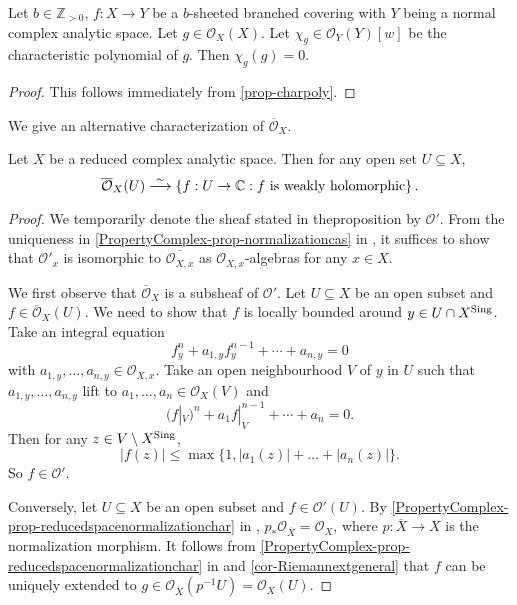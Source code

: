 \begin{proposition}\label{prop-charpolygen}
    Let $b\in \mathbb{Z}_{>0}$, $f:X\rightarrow Y$ be a $b$-sheeted branched covering with $Y$ being a normal complex analytic space. Let $g\in \mathcal{O}_X(X)$. Let $\chi_g\in \mathcal{O}_Y(Y)[w]$ be the characteristic polynomial of $g$. Then $\chi_g(g)=0$.
\end{proposition}
\begin{proof}
    This follows immediately from \cref{prop-charpoly}.
\end{proof}

We give an alternative characterization of $\overline{\mathcal{O}}_X$.
\begin{proposition}
    Let $X$ be a reduced complex analytic space. Then for any open set $U\subseteq X$, 
    \[
        \overline{\mathcal{O}}_X(U)\stackrel{\sim}{\longrightarrow} \left\{f:U\rightarrow \mathbb{C}: f\text{ is weakly holomorphic} \right\}.      
    \]
\end{proposition}

\begin{proof}
    We temporarily denote the sheaf stated in theproposition by $\mathcal{O}'$. From the uniqueness in \cref{PropertyComplex-prop-normalizationcas} in , it suffices to show that $\mathcal{O}'_{x}$ is isomorphic to $\overline{\mathcal{O}_{X,x}}$ as $\mathcal{O}_{X,x}$-algebras for any $x\in X$.

    We first observe that $\overline{\mathcal{O}}_X$ is a subsheaf of  $\mathcal{O}'$. Let $U\subseteq X$ be an open subset and $f\in \overline{\mathcal{O}}_X(U)$.  We need to show that $f$ is locally bounded around $y\in U\cap X^{\operatorname{Sing}}$. 
    Take an integral equation
    \[
        f_y^n+a_{1,y}f_y^{n-1}+\cdots+a_{n,y}=0  
    \]
    with $a_{1,y},\ldots,a_{n,y}\in \mathcal{O}_{X,x}$.
    Take an open neighbourhood $V$ of $y$ in $U$ such that $a_{1,y},\ldots,a_{n,y}$ lift to $a_1,\ldots,a_n\in \mathcal{O}_X(V)$ and
    \[
        (f|_V)^n +a_1f|_V^{n-1}+\cdots+ a_n=0. 
    \] 
    Then for any $z\in V\setminus X^{\operatorname{Sing}}$,
    \[
        |f(z)|\leq \max\{1,|a_1(z)|+\ldots+|a_n(z)|\}.  
    \]
    So $f\in \mathcal{O}'$. 
    
    Conversely, let $U\subseteq X$ be an open subset and $f\in \mathcal{O}'(U)$. By \cref{PropertyComplex-prop-reducedspacenormalizationchar} in , $p_*\mathcal{O}_{\overline{X}}=\mathcal{O}_X$, where $p:\overline{X}\rightarrow X$ is the normalization morphism. It follows from \cref{PropertyComplex-prop-reducedspacenormalizationchar} in  and \cref{cor-Riemannextgeneral} that $f$ can be uniquely extended to $g\in \mathcal{O}_{\overline{X}}(p^{-1}U)=\mathcal{O}_X(U)$.
\end{proof}


